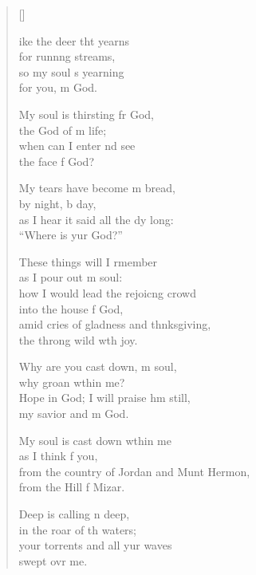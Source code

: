 \settowidth{\versewidth}{From the country of Jordan and Mount Hermon}
\begin{verse}[\versewidth]
  \begin{patverse}
ike the deer tht yearns\Med\\
for runn\pointup{\i}ng streams,\\
so my soul \pointup{\i}s yearning\Med\\
for you, m God.

My soul is thirsting fr God,\Med\\
the God of m life;\\
when can I enter nd see\Med\\
the face f God?

My tears have become m bread,\Med\\
by night, b day,\\
as I hear it said all the dy long:\Med\\
“Where is yur God?”

These things will I rmember\Med\\
as I pour out m soul:\\
how I would lead the rejoic\pointup{\i}ng crowd\Med\\
into the house f God,\\
amid cries of gladness and thnksgiving,\Med\\
the throng wild w\pointup{\i}th joy.

Why are you cast down, m soul,\Med\\
why groan w\pointup{\i}thin me?\\
Hope in God; I will praise h\pointup{\i}m still,\Med\\
my savior and m God.

My soul is cast down w\pointup{\i}thin me\Med\\
as I think f you,\\
from the country of Jordan and Munt Hermon,\Med\\
from the Hill f Mizar.

Deep is calling n deep,\Med\\
in the roar of th waters;\\
your torrents and all yur waves\Med\\
swept ovr me.


\end{patverse}
\end{verse}

